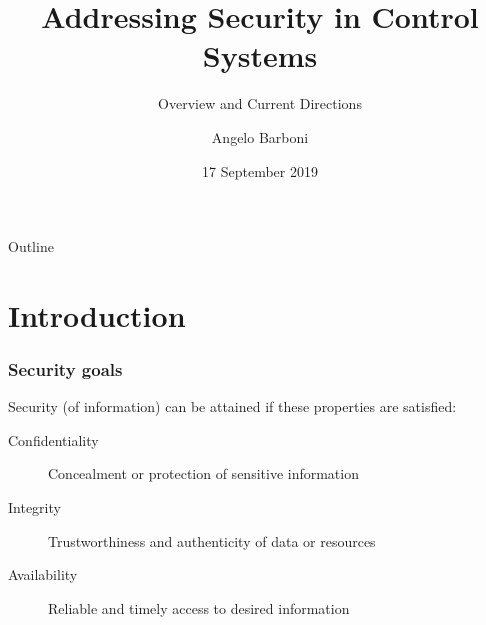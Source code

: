 \documentclass[presentation]{beamer}
\title{Addressing Security in Control Systems}
\subtitle{Overview and Current Directions}
\author{Angelo Barboni}
\date{17 September 2019}
\begin{document}
 
\begin{frame}
\titlepage
\end{frame}

\begin{frame}{Outline}
    \tableofcontents
\end{frame}


\section{Introduction}

\begin{frame}
	\frametitle{Security goals}

	Security (of information) can be attained if these properties are satisfied:
	\vfill
	\begin{description}
		\item[Confidentiality] Concealment or protection of sensitive information
		\item[Integrity] Trustworthiness and authenticity of data or resources 
		\item[Availability] Reliable and timely access to desired information 
	\end{description}
	\vfill
	\null
\end{frame}
\end{document}
